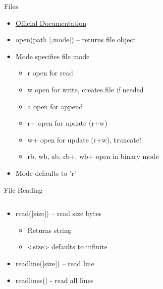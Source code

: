 % 
% 
% 
\begin{Slide}{Files}

  \begin{itemize}
  \item \underline{\href{https://docs.python.org/3.4/tutorial/inputoutput.html\#reading-and-writing-files}{Official Documentation}}
  \item open(path [,mode]) – returns file object
  \item Mode specifies file mode
    \begin{itemize}
    \item r  open for read
    \item w  open for write, creates file if needed
    \item a  open for append
    \item r+ open for update (r+w)
    \item w+ open for update (r+w), truncate!
    \item rb, wb, ab, rb+, wb+  open in binary mode
    \end{itemize}
  \item Mode defaults to 'r'
  \end{itemize}

\end{Slide}

% 
% 
% 
\begin{Slide}{File Reading}
  \begin{columns}
    \begin{column}{.48\textwidth}
      \begin{itemize}
      \item read([size]) – read size bytes
        \begin{itemize}
        \item Returns string
        \item <size> defaults to infinite
        \end{itemize}
      \item readline([size]) – read line
      \item readlines() - read all lines

      \end{itemize}
    \end{column}

    \hfill

    \begin{column}{.48\textwidth}

      \pause

      \inputminted[firstline=3,
      lastline=27,
      breaklines,
      fontsize=\tiny,
      bgcolor=Background,
      linenos]{python}{../src/filer.py}
      
    \end{column}
  \end{columns} 
\end{Slide}

